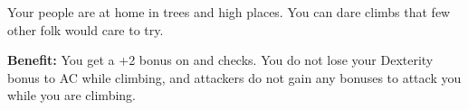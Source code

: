 
Your people are at home in trees and high places. You can dare climbs that few other folk would care to try.

\textbf{Benefit:} You get a +2 bonus on  and  checks. You do not lose your Dexterity bonus to AC while climbing, and attackers do not gain any bonuses to attack you while you are climbing.